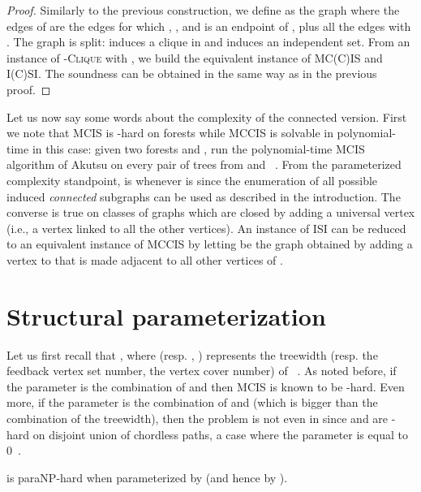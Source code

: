 \begin{proof}
Similarly to the previous construction, we define  as the graph 
 where the edges of  are the edges  for which 
, , and  is an endpoint of , plus all the edges 
 with . 
The graph  is split:  induces a clique in  and  induces 
an independent set.
From an instance  of \textsc{-Clique} with , we build the 
equivalent instance  of MC(C)IS and I(C)SI.
The soundness can be obtained in the same way as in the previous proof.
\end{proof}









Let us now say some words about the complexity of the connected version.
First we note that MCIS is -hard on forests while MCCIS is solvable in 
polynomial-time in this case: given two forests  and , run the 
polynomial-time MCIS algorithm of Akutsu on every pair of trees 
from  and ~\cite{Akutsu1992}.
From the parameterized complexity standpoint,
\mccis is  whenever \isi is  
since the enumeration of all  possible induced \emph{connected} subgraphs can be used as described in the introduction.
The converse is true on classes of graphs which are closed by adding a universal vertex (i.e., a vertex linked to all the other vertices).
An instance  of ISI can be reduced to an equivalent instance  of MCCIS by letting  be the graph obtained by adding a vertex to  that is made adjacent to all other vertices of .


\section{Structural parameterization}\label{sec:struct}

Let us first recall that , where  (resp. , ) represents the treewidth (resp. the feedback vertex set number, the vertex cover number) of ~\cite{Fellows2013}.
As noted before, if the parameter is the combination of  and  then MCIS is known to be -hard.
Even more, if the parameter is the combination of  and  (which is bigger than the combination of the treewidth), then the problem is not even in  since \mcis and \isi are -hard on disjoint union of chordless paths, a case where the parameter is equal to 0~\cite{Damaschke1991,Garey1979}.



\begin{theorem}
\label{notinXP}
\mcis is paraNP-hard when parameterized by  (and hence by ).
\end{theorem}







